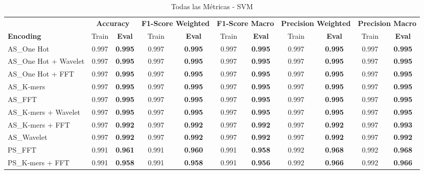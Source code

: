 \begin{table*}[htbp]
\centering
\caption{Todas las Métricas - SVM}
\label{tab:svm_complete}
\scriptsize
\begin{tabular}{lcccccccccc}
\toprule
& \multicolumn{2}{c}{\textbf{Accuracy}} & \multicolumn{2}{c}{\textbf{F1-Score Weighted}} & \multicolumn{2}{c}{\textbf{F1-Score Macro}} & \multicolumn{2}{c}{\textbf{Precision Weighted}} & \multicolumn{2}{c}{\textbf{Precision Macro}} \\
\cmidrule(lr){2-3} \cmidrule(lr){4-5} \cmidrule(lr){6-7} \cmidrule(lr){8-9} \cmidrule(lr){10-11}
\textbf{Encoding} & Train & \textbf{Eval} & Train & \textbf{Eval} & Train & \textbf{Eval} & Train & \textbf{Eval} & Train & \textbf{Eval} \\
\midrule
AS\_One Hot & 0.997 & \textbf{0.995} & 0.997 & \textbf{0.995} & 0.997 & \textbf{0.995} & 0.997 & \textbf{0.995} & 0.997 & \textbf{0.995} \\
AS\_One Hot + Wavelet & 0.997 & \textbf{0.995} & 0.997 & \textbf{0.995} & 0.997 & \textbf{0.995} & 0.997 & \textbf{0.995} & 0.997 & \textbf{0.995} \\
AS\_One Hot + FFT & 0.997 & \textbf{0.995} & 0.997 & \textbf{0.995} & 0.997 & \textbf{0.995} & 0.997 & \textbf{0.995} & 0.997 & \textbf{0.995} \\
AS\_K-mers & 0.997 & \textbf{0.995} & 0.997 & \textbf{0.995} & 0.997 & \textbf{0.995} & 0.997 & \textbf{0.995} & 0.997 & \textbf{0.995} \\
AS\_FFT & 0.997 & \textbf{0.995} & 0.997 & \textbf{0.995} & 0.997 & \textbf{0.995} & 0.997 & \textbf{0.995} & 0.997 & \textbf{0.995} \\
AS\_K-mers + Wavelet & 0.997 & \textbf{0.995} & 0.997 & \textbf{0.995} & 0.997 & \textbf{0.995} & 0.997 & \textbf{0.995} & 0.997 & \textbf{0.995} \\
AS\_K-mers + FFT & 0.997 & \textbf{0.992} & 0.997 & \textbf{0.992} & 0.997 & \textbf{0.992} & 0.997 & \textbf{0.992} & 0.997 & \textbf{0.993} \\
AS\_Wavelet & 0.997 & \textbf{0.992} & 0.997 & \textbf{0.992} & 0.997 & \textbf{0.992} & 0.997 & \textbf{0.992} & 0.997 & \textbf{0.992} \\
PS\_FFT & 0.991 & \textbf{0.961} & 0.991 & \textbf{0.960} & 0.991 & \textbf{0.958} & 0.992 & \textbf{0.968} & 0.992 & \textbf{0.968} \\
PS\_K-mers + FFT & 0.991 & \textbf{0.958} & 0.991 & \textbf{0.958} & 0.991 & \textbf{0.956} & 0.992 & \textbf{0.966} & 0.992 & \textbf{0.966} \\

\end{tabular}
\end{table*}
